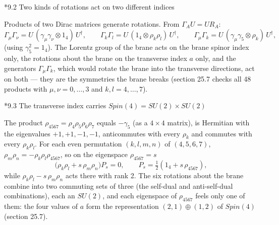 \documentclass[10pt,a4paper]{article}
\makeatletter
\renewcommand\subsection{\@startsection{subsection}{2}{\z@}{-3.25ex\@plus -1ex \@minus -.2ex}{1.5ex \@plus .2ex}{\normalfont\large\bfseries\raggedright}}
\makeatother
\begin{document}
\subsection*{9.2 Two kinds of rotations act on two different indices}
Products of two Dirac matrices generate rotations. From $\Gamma_AU=UR_A$:
\begin{equation*}
\Gamma_\mu\Gamma_\nu=U\,(\gamma_\mu\gamma_\nu\otimes1_4)\,U^\dagger,\qquad \Gamma_k\Gamma_l=U\,(1_4\otimes\rho_k\rho_l)\,U^\dagger,\qquad \Gamma_\mu\Gamma_k=U\,(\gamma_\mu\gamma_5\otimes\rho_k)\,U^\dagger,
\end{equation*}
(using $\gamma_5^2=1_4$). The Lorentz group of the brane acts on the brane spinor index only, the rotations about the brane on the transverse index $a$ only, and the generators $\Gamma_\mu\Gamma_k$, which would rotate the brane into the transverse directions, act on both — they are the symmetries the brane breaks (section 25.7 checks all 48 products with $\mu,\nu=0,\dots,3$ and $k,l=4,\dots,7$).

\subsection*{9.3 The transverse index carries \texorpdfstring{$Spin(4)=SU(2)\times SU(2)$}{Spin(4)=SU(2) SU(2)}}
The product $\rho_{4567}=\rho_4\rho_5\rho_6\rho_7$ equals $-\gamma_5$ (as a $4\times4$ matrix), is Hermitian with the eigenvalues $+1,+1,-1,-1$, anticommutes with every $\rho_k$ and commutes with every $\rho_k\rho_l$. For each even permutation $(k,l,m,n)$ of $(4,5,6,7)$, $\rho_m\rho_n=-\rho_k\rho_l\rho_{4567}$, so on the eigenspace $\rho_{4567}=s$
\begin{equation*}
\big(\rho_k\rho_l+s\,\rho_m\rho_n\big)P_s=0,\qquad P_s=\tfrac12(1_4+s\,\rho_{4567}),
\end{equation*}
while $\rho_k\rho_l-s\,\rho_m\rho_n$ acts there with rank 2. The six rotations about the brane combine into two commuting sets of three (the self-dual and anti-self-dual combinations), each an $SU(2)$, and each eigenspace of $\rho_{4567}$ feels only one of them: the four values of $a$ form the representation $(2,1)\oplus(1,2)$ of $Spin(4)$ (section 25.7).
\end{document}
